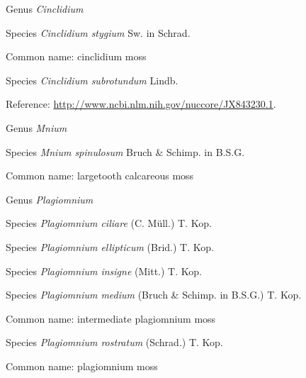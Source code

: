 \documentclass[9pt, article]{memoir}
\begin{document}
\begin{multicols}{2}
\vspace{6pt}\noindent\hspace{30pt}Genus \textit{Cinclidium}


\vspace{6pt}\noindent\hspace{36pt}Species \textit{Cinclidium stygium} Sw. in Schrad.


Common name: cinclidium moss

\vspace{6pt}\noindent\hspace{36pt}Species \textit{Cinclidium subrotundum} Lindb.


Reference: 
\url{http://www.ncbi.nlm.nih.gov/nuccore/JX843230.1}.

\vspace{6pt}\noindent\hspace{30pt}Genus \textit{Mnium}


\vspace{6pt}\noindent\hspace{36pt}Species \textit{Mnium spinulosum} Bruch \& Schimp. in B.S.G.


Common name: largetooth calcareous moss

\vspace{6pt}\noindent\hspace{30pt}Genus \textit{Plagiomnium}


\vspace{6pt}\noindent\hspace{36pt}Species \textit{Plagiomnium ciliare} (C. Müll.) T. Kop.


\vspace{6pt}\noindent\hspace{36pt}Species \textit{Plagiomnium ellipticum} (Brid.) T. Kop.


\vspace{6pt}\noindent\hspace{36pt}Species \textit{Plagiomnium insigne} (Mitt.) T. Kop.


\vspace{6pt}\noindent\hspace{36pt}Species \textit{Plagiomnium medium} (Bruch \& Schimp. in B.S.G.) T. Kop.


Common name: intermediate plagiomnium moss

\vspace{6pt}\noindent\hspace{36pt}Species \textit{Plagiomnium rostratum} (Schrad.) T. Kop.


Common name: plagiomnium moss


\end{multicols}
\end{document}
